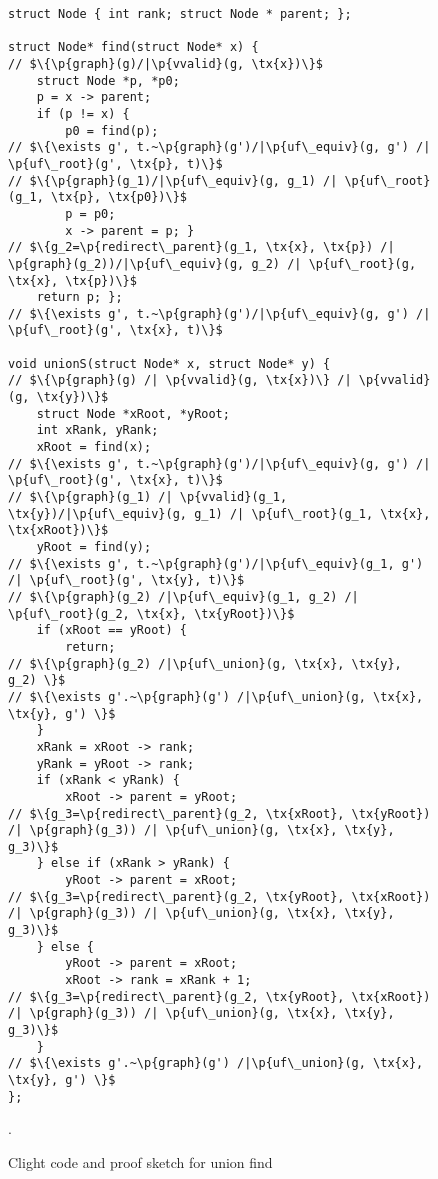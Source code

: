 \begin{figure}[htbp]
  \begin{lstlisting}
struct Node { int rank; struct Node * parent; };

struct Node* find(struct Node* x) {
// $\{\p{graph}(g)/|\p{vvalid}(g, \tx{x})\}$
    struct Node *p, *p0;
    p = x -> parent;
    if (p != x) {
        p0 = find(p);
// $\{\exists g', t.~\p{graph}(g')/|\p{uf\_equiv}(g, g') /| \p{uf\_root}(g', \tx{p}, t)\}$      
// $\{\p{graph}(g_1)/|\p{uf\_equiv}(g, g_1) /| \p{uf\_root}(g_1, \tx{p}, \tx{p0})\}$
        p = p0;
        x -> parent = p; }
// $\{g_2=\p{redirect\_parent}(g_1, \tx{x}, \tx{p}) /| \p{graph}(g_2))/|\p{uf\_equiv}(g, g_2) /| \p{uf\_root}(g, \tx{x}, \tx{p})\}$
    return p; };
// $\{\exists g', t.~\p{graph}(g')/|\p{uf\_equiv}(g, g') /| \p{uf\_root}(g', \tx{x}, t)\}$

void unionS(struct Node* x, struct Node* y) {
// $\{\p{graph}(g) /| \p{vvalid}(g, \tx{x})\} /| \p{vvalid}(g, \tx{y})\}$
    struct Node *xRoot, *yRoot;
    int xRank, yRank;
    xRoot = find(x);
// $\{\exists g', t.~\p{graph}(g')/|\p{uf\_equiv}(g, g') /| \p{uf\_root}(g', \tx{x}, t)\}$
// $\{\p{graph}(g_1) /| \p{vvalid}(g_1, \tx{y})/|\p{uf\_equiv}(g, g_1) /| \p{uf\_root}(g_1, \tx{x}, \tx{xRoot})\}$
    yRoot = find(y);
// $\{\exists g', t.~\p{graph}(g')/|\p{uf\_equiv}(g_1, g') /| \p{uf\_root}(g', \tx{y}, t)\}$
// $\{\p{graph}(g_2) /|\p{uf\_equiv}(g_1, g_2) /| \p{uf\_root}(g_2, \tx{x}, \tx{yRoot})\}$
    if (xRoot == yRoot) {
        return;
// $\{\p{graph}(g_2) /|\p{uf\_union}(g, \tx{x}, \tx{y}, g_2) \}$
// $\{\exists g'.~\p{graph}(g') /|\p{uf\_union}(g, \tx{x}, \tx{y}, g') \}$
    }
    xRank = xRoot -> rank;
    yRank = yRoot -> rank;
    if (xRank < yRank) {
        xRoot -> parent = yRoot;
// $\{g_3=\p{redirect\_parent}(g_2, \tx{xRoot}, \tx{yRoot}) /| \p{graph}(g_3)) /| \p{uf\_union}(g, \tx{x}, \tx{y}, g_3)\}$
    } else if (xRank > yRank) {
        yRoot -> parent = xRoot;
// $\{g_3=\p{redirect\_parent}(g_2, \tx{yRoot}, \tx{xRoot}) /| \p{graph}(g_3)) /| \p{uf\_union}(g, \tx{x}, \tx{y}, g_3)\}$
    } else {
        yRoot -> parent = xRoot;
        xRoot -> rank = xRank + 1;
// $\{g_3=\p{redirect\_parent}(g_2, \tx{yRoot}, \tx{xRoot}) /| \p{graph}(g_3)) /| \p{uf\_union}(g, \tx{x}, \tx{y}, g_3)\}$
    }
// $\{\exists g'.~\p{graph}(g') /|\p{uf\_union}(g, \tx{x}, \tx{y}, g') \}$
};
  \end{lstlisting}
  \caption{Clight code and proof sketch for union find}.
  \label{fig:unionfind}
\end{figure}
